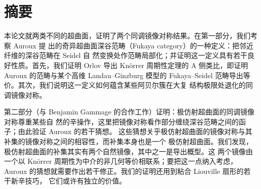 \section*{摘要}

本论文就两类不同的超曲面，证明了两个同调镜像对称结果。在第一部分，我们考察 Auroux 提
出的奇异超曲面深谷范畴（Fukaya category）的一种定义：把邻近纤维的深谷范畴在 Seidel 自
然变换处作范畴局部化；并证明这一定义具有若干良好性质。首先，我们证明 Orlov 导出
Kn{\"o}rrer 周期性定理的 A 侧类比，即证明 Auroux 的范畴与某个高维 Landau--Ginzburg
模型的 Fukaya--Seidel 范畴导出等价。其次，我们说明这一定义如何蕴含某些阿贝尔簇在大复
结构极限处退化的同调镜像对称。

第二部分（与 Benjamin Gammage 的合作工作）证明：极仿射超曲面的同调镜像对称尊重某些自
然的辛操作，这里把镜像对称看作部分缠绕深谷范畴之间的函子；由此验证 Auroux 的若干猜想。
这些猜想关乎极仿射超曲面的镜像对称与其补集的镜像对称之间的相容性，而补集本身也是一个
极仿射超曲面。我们发现，极仿射超曲面的补集其实有两个自然镜像，其中之一是导出概型。这
两个镜像由一个以 Kn{\"o}rrer 周期性为中介的非几何等价相联系；要把这一点纳入考虑，
Auroux 的猜想就需要作出若干修正。我们的证明还用到粘合 Liouville 扇形的若干新辛技巧，
它们或许有独立的价值。

